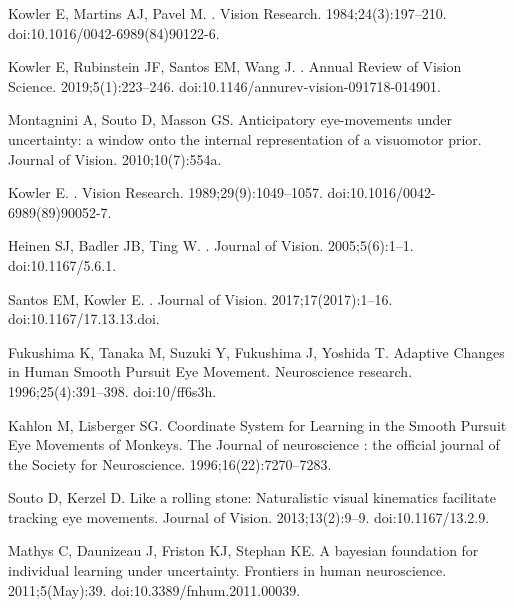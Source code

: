 \documentclass[10pt,letterpaper]{article}
\begin{document}
\begin{thebibliography}{10}
Kowler E, Martins AJ, Pavel M.
.
\newblock Vision Research. 1984;24(3):197--210.
\newblock doi:{10.1016/0042-6989(84)90122-6}.

Kowler E, Rubinstein JF, Santos EM, Wang J.
.
\newblock Annual Review of Vision Science. 2019;5(1):223--246.
\newblock doi:{10.1146/annurev-vision-091718-014901}.

Montagnini A, Souto D, Masson GS.
\newblock Anticipatory eye-movements under uncertainty: a window onto the
  internal representation of a visuomotor prior.
\newblock Journal of Vision. 2010;10(7):554a.

Kowler E.
.
\newblock Vision Research. 1989;29(9):1049--1057.
\newblock doi:{10.1016/0042-6989(89)90052-7}.

Heinen SJ, Badler JB, Ting W.
.
\newblock Journal of Vision. 2005;5(6):1--1.
\newblock doi:{10.1167/5.6.1}.

Santos EM, Kowler E.
.
\newblock Journal of Vision. 2017;17(2017):1--16.
\newblock doi:{10.1167/17.13.13.doi}.

Fukushima K, Tanaka M, Suzuki Y, Fukushima J, Yoshida T.
\newblock Adaptive Changes in Human Smooth Pursuit Eye Movement.
\newblock Neuroscience research. 1996;25(4):391--398.
\newblock doi:{10/ff6s3h}.

Kahlon M, Lisberger SG.
\newblock Coordinate System for Learning in the Smooth Pursuit Eye Movements of
  Monkeys.
\newblock The Journal of neuroscience : the official journal of the Society for
  Neuroscience. 1996;16(22):7270--7283.

Souto D, Kerzel D.
\newblock Like a rolling stone: Naturalistic visual kinematics facilitate
  tracking eye movements.
\newblock Journal of Vision. 2013;13(2):9--9.
\newblock doi:{10.1167/13.2.9}.

Mathys C, Daunizeau J, Friston KJ, Stephan KE.
\newblock A bayesian foundation for individual learning under uncertainty.
\newblock Frontiers in human neuroscience. 2011;5(May):39.
\newblock doi:{10.3389/fnhum.2011.00039}.


\end{thebibliography}
\end{document}
